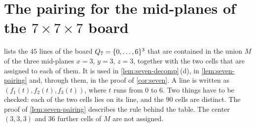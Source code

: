 \section{The pairing for the mid-planes of the \texorpdfstring{$7\times7\times7$}{7x7x7}
board}\label{sec:seven-pairing}

 lists the $45$ lines of the board $Q_7=\{0,\dots,6\}^3$ that are contained in
the union $M$ of the three mid-planes $x=3$, $y=3$, $z=3$, together with the two cells that are assigned
to each of them. It is used in \cref{lem:seven-decomp}\,(d), in \cref{lem:seven-pairing} and, through
them, in the proof of \cref{cor:seven}. A line is written as $(f_1(t),f_2(t),f_3(t))$, where $t$ runs
from $0$ to $6$. Two things have to be checked: each of the two cells lies on its line, and the $90$
cells are distinct. The proof of \cref{lem:seven-pairing} describes the rule behind the table. The
center $(3,3,3)$ and $36$ further cells of $M$ are not assigned.

